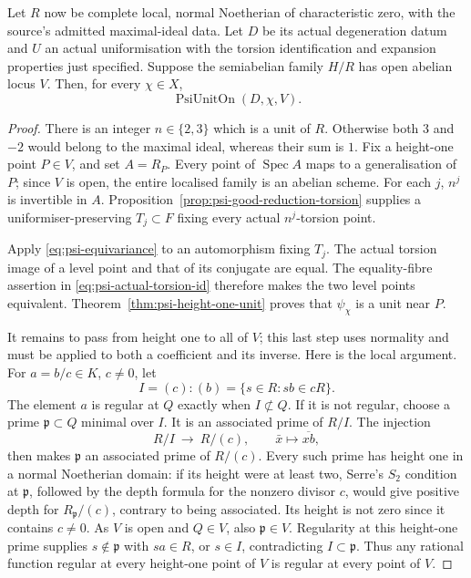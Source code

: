\begin{srtheorem}
\label{thm:psi-unit-abelian-locus}
Let \(R\) now be complete local, normal Noetherian of characteristic
zero, with the source's admitted maximal-ideal data.
Let \(D\) be its actual degeneration datum and \(U\) an actual
uniformisation with the torsion identification and expansion
properties just specified.  Suppose the semiabelian family \(H/R\)
has open abelian locus \(V\).  Then, for every \(\chi\in X\),
\[
                         \operatorname{PsiUnitOn}(D,\chi,V).
\]
\end{srtheorem}
\begin{proof}
There is an integer \(n\in\{2,3\}\) which is a unit of \(R\).
Otherwise both \(3\) and \(-2\) would belong to the maximal ideal,
whereas their sum is \(1\).
Fix a height-one point \(P\in V\), and set \(A=R_P\).
Every point of \(\operatorname{Spec}A\) maps to a generalisation of
\(P\); since \(V\) is open, the entire localised family is an
abelian scheme.  For each \(j\), \(n^j\) is invertible in \(A\).
Proposition~\ref{prop:psi-good-reduction-torsion} supplies a
uniformiser-preserving \(T_j\subset F\) fixing every actual
\(n^j\)-torsion point.

Apply \eqref{eq:psi-equivariance} to an automorphism fixing \(T_j\).
The actual torsion image of a level point and that of its conjugate
are equal.  The equality-fibre assertion in
\eqref{eq:psi-actual-torsion-id} therefore makes the two level points
equivalent.  Theorem~\ref{thm:psi-height-one-unit} proves that
\(\psi_\chi\) is a unit near \(P\).

It remains to pass from height one to all of \(V\); this last step
uses normality and must be applied to both a coefficient and its
inverse.  Here is the local argument.  For \(a=b/c\in K\), \(c\ne0\),
let
\[
                    I=(c):(b)=\{s\in R:sb\in cR\}.
\]
The element \(a\) is regular at \(Q\) exactly when \(I\not\subset Q\).
If it is not regular, choose a prime \(\mathfrak p\subset Q\) minimal
over \(I\).  It is an associated prime of \(R/I\).
The injection
\[
                R/I\ \longrightarrow\ R/(c),\qquad
                \bar x\longmapsto\overline{xb},
\]
then makes \(\mathfrak p\) an associated prime of \(R/(c)\).
Every such prime has height one in a normal Noetherian domain:
if its height were at least two, Serre's \(S_2\) condition at
\(\mathfrak p\), followed by the depth formula for the nonzero divisor
\(c\), would give positive depth for \(R_{\mathfrak p}/(c)\),
contrary to being associated.  Its height is not zero since it
contains \(c\ne0\).
As \(V\) is open and \(Q\in V\), also \(\mathfrak p\in V\).
Regularity at this height-one prime supplies
\(s\notin\mathfrak p\) with \(sa\in R\), or \(s\in I\), contradicting
\(I\subset\mathfrak p\).
Thus any rational function regular at every height-one point of
\(V\) is regular at every point of \(V\).


\end{proof}
